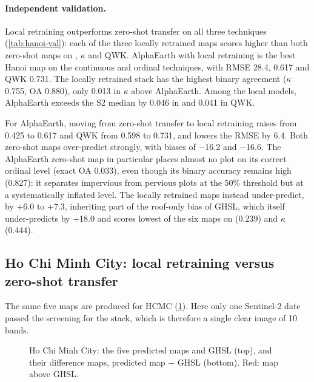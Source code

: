 \paragraph{Independent validation.} Local retraining outperforms zero-shot
transfer on all three techniques (\cref{tab:hanoi-val}): each of the three
locally retrained maps scores higher than both zero-shot maps on \Rsq,
$\kappa$ and QWK. AlphaEarth with local retraining is the best Hanoi map on
the continuous and ordinal techniques, with RMSE 28.4\pp, \Rsq{} 0.617 and
QWK 0.731. The locally retrained stack has the highest binary agreement
($\kappa$ 0.755, OA 0.880), only 0.013 in $\kappa$ above AlphaEarth. Among
the local models, AlphaEarth exceeds the S2 median by 0.046 in \Rsq{} and
0.041 in QWK.

For AlphaEarth, moving from zero-shot transfer to local retraining raises
\Rsq{} from 0.425 to 0.617 and QWK from 0.598 to 0.731, and lowers the RMSE
by 6.4\pp. Both zero-shot maps over-predict strongly, with biases of
$-$16.2 and $-$16.6\pp. The AlphaEarth zero-shot map in particular places
almost no plot on its correct ordinal level (exact OA 0.033), even though
its binary accuracy remains high (0.827): it separates impervious from
pervious plots at the 50\% threshold but at a systematically inflated
level. The locally retrained maps instead under-predict, by +6.0 to
+7.3\pp, inheriting part of the roof-only bias of GHSL, which itself
under-predicts by +18.0\pp{} and scores lowest of the six maps on \Rsq{}
(0.239) and $\kappa$ (0.444).

\subsection{Ho Chi Minh City: local retraining versus zero-shot transfer}
\label{sec:res-hcmc}

The same five maps are produced for HCMC (\cref{fig:hcmc-maps}). Here only
one Sentinel-2 date passed the screening for the stack, which is therefore a
single clear image of 10 bands.

\begin{figure}[htbp]
  \centering
  \caption{Ho Chi Minh City: the five predicted maps and GHSL (top), and
  their difference maps, predicted map $-$ GHSL (bottom). Red: map above
  GHSL.}
  \label{fig:hcmc-maps}
\end{figure}

